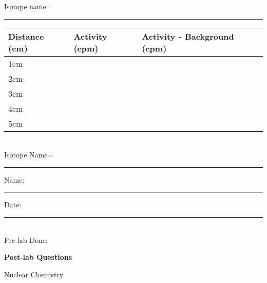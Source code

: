 \documentclass[main.tex]{subfiles}
\begin{document}
\begin{center}Isotope name=\rule{5cm}{0.4pt}\end{center}
\begin{center}\begin{tabular}{ |p{3cm}|p{5cm}|p{5cm}|  }
\hline
    Distance (cm) &   Activity (cpm) &   Activity - Background (cpm)         \\
\hline
   \vspace{0cm}\vspace{.5cm}1cm &     &            \\
\hline
   \vspace{0cm}\vspace{.5cm}2cm &     &            \\
\hline
   \vspace{0cm}\vspace{.5cm}3cm &     &            \\
\hline
   \vspace{0cm}\vspace{.5cm}4cm &     &            \\
\hline
   \vspace{0cm}\vspace{.5cm}5cm &     &            \\
\hline
\end{tabular}\end{center}



 


\begin{center}
 \\
\vspace{0.2cm}
Isotope Name=\rule{5cm}{0.4pt}
\end{center}


\newpage\begin{multicols}{2}
\begin{tcolorbox}[enhanced jigsaw,breakable,size=title,
colback=mybrown!05,colframe=black,fonttitle=\bfseries,
title=STUDENT INFO,pad at break=1mm, break at=15cm/0pt ]
\vspace{0.2cm}
\noindent Name: \rule{5cm}{0.4pt}Date:\rule{1cm}{0.4pt}\\
Pre-lab Done: \quad
\end{tcolorbox}
\end{multicols}
\hfill
\vspace{0.2cm}
\begin{center}
{\large \bfseries 
Post-lab Questions 
\par
\Huge
Nuclear Chemistry
\\[5pt] \par}
\vspace{0.2cm}
\end{center}
\par
\noindent
\uline{  \hfill \normalsize \hfill       }
\end{document}
